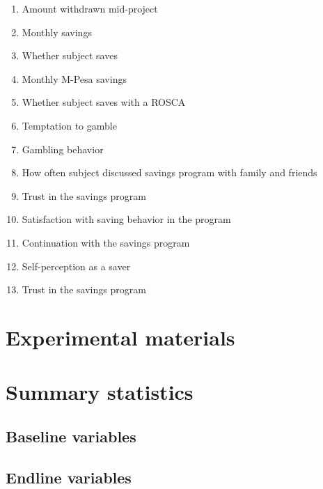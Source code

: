 \documentclass[11pt]{article}
\begin{document}
		\begin{enumerate}
		\item Amount withdrawn mid-project
		\item Monthly savings
		\item Whether subject saves
		\item Monthly M-Pesa savings
		\item Whether subject saves with a ROSCA
		\item Temptation to gamble
		\item Gambling behavior
		\item How often subject discussed savings program with family and friends
		\item Trust in the savings program
		\item Satisfaction with saving behavior in the program
		\item Continuation with the savings program
		\item Self-perception as a saver
		\item Trust in the savings program
		\end{enumerate}

\section{Experimental materials}


	\clearpage

\section{Summary statistics}

	\subsection{Baseline variables}

		
		
		
		
		

	\clearpage

	\subsection{Endline variables}

		
		
		
		
		
		
\end{document}

